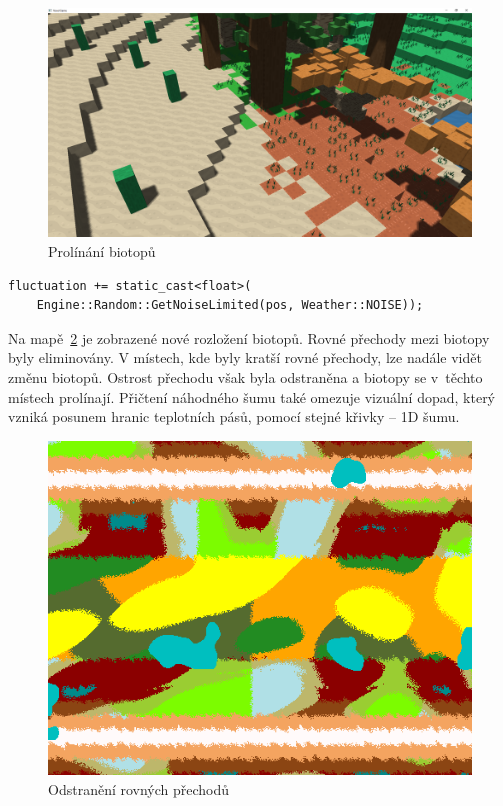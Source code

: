 \documentclass[thesis=M,czech]{FITthesis}[2019/12/23]
\begin{document}
\begin{figure}\centering
	\includegraphics[width=\textwidth]{images/world_gen/fuzzy_trans}
	\caption[Prolínání biotopů]{Prolínání biotopů}\label{fig:fuzzy_trans}
\end{figure}

\begin{verbatim}
fluctuation += static_cast<float>(
    Engine::Random::GetNoiseLimited(pos, Weather::NOISE));
\end{verbatim}

Na mapě~\ref{fig:biomes_new} je zobrazené nové rozložení biotopů. Rovné přechody mezi biotopy byly eliminovány. V místech, kde byly kratší rovné přechody, lze nadále vidět změnu biotopů. Ostrost přechodu však byla odstraněna a biotopy se v~těchto místech prolínají. Přičtení náhodného šumu také omezuje vizuální dopad, který vzniká posunem hranic teplotních pásů, pomocí stejné křivky -- 1D šumu.

\begin{figure}\centering
	\includegraphics[width=\textwidth]{images/world_gen/biomes_new}
	\caption[Odstranění rovných přechodů]{Odstranění rovných přechodů}\label{fig:biomes_new}
\end{figure}
\end{document}
